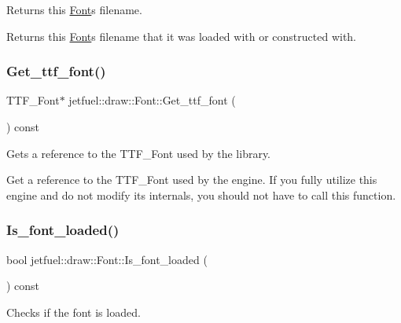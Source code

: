 Returns this \hyperlink{classjetfuel_1_1draw_1_1Font}{Font}\textquotesingle{}s filename. 

Returns this \hyperlink{classjetfuel_1_1draw_1_1Font}{Font}\textquotesingle{}s filename that it was loaded with or constructed with. \mbox{\label{classjetfuel_1_1draw_1_1Font_aa6583c70e9b801b16dc78ca3a156bc97}} 
\subsubsection{\texorpdfstring{Get\+\_\+ttf\+\_\+font()}{Get\_ttf\_font()}}
{\footnotesize\ttfamily T\+T\+F\+\_\+\+Font$\ast$ jetfuel\+::draw\+::\+Font\+::\+Get\+\_\+ttf\+\_\+font (\begin{DoxyParamCaption}{ }\end{DoxyParamCaption}) const\hspace{0.3cm}{\ttfamily [inline]}}



Gets a reference to the T\+T\+F\+\_\+\+Font used by the library. 

Get a reference to the T\+T\+F\+\_\+\+Font used by the engine. If you fully utilize this engine and do not modify it\textquotesingle{}s internals, you should not have to call this function. \mbox{\label{classjetfuel_1_1draw_1_1Font_a23a8e0aed90fac334f939d1b10864976}} 
\subsubsection{\texorpdfstring{Is\+\_\+font\+\_\+loaded()}{Is\_font\_loaded()}}
{\footnotesize\ttfamily bool jetfuel\+::draw\+::\+Font\+::\+Is\+\_\+font\+\_\+loaded (\begin{DoxyParamCaption}{ }\end{DoxyParamCaption}) const\hspace{0.3cm}{\ttfamily [inline]}}



Checks if the font is loaded. 


